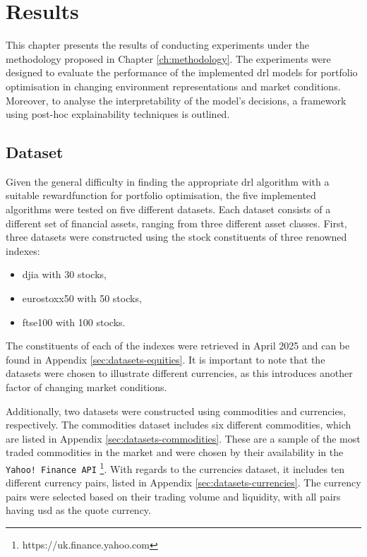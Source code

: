 \chapter{Results} \label{ch:results}

This chapter presents the results of conducting experiments under the methodology proposed in Chapter \ref{ch:methodology}. The experiments were designed to evaluate the performance of the implemented \acrshort{drl} models for portfolio optimisation in changing environment representations and market conditions. Moreover, to analyse the interpretability of the model's decisions, a framework using post-hoc explainability techniques is outlined.

\section{Dataset} \label{sec:dataset}

Given the general difficulty in finding the appropriate \acrshort{drl} algorithm with a suitable \gls{rewardfunction} for portfolio optimisation, the five implemented algorithms were tested on five different datasets. Each dataset consists of a different set of financial assets, ranging from three different asset classes. First, three datasets were constructed using the stock constituents of three renowned indexes:
\begin{itemize}
    \item \acrfull{djia} with 30 stocks,
    \item \acrfull{eurostoxx50} with 50 stocks,
    \item \acrfull{ftse100} with 100 stocks.
\end{itemize}

The constituents of each of the indexes were retrieved in April 2025 and can be found in Appendix \ref{sec:datasets-equities}. It is important to note that the datasets were chosen to illustrate different currencies, as this introduces another factor of changing market conditions. 

Additionally, two datasets were constructed using commodities and currencies, respectively. The commodities dataset includes six different commodities, which are listed in Appendix \ref{sec:datasets-commodities}. These are a sample of the most traded commodities in the market and were chosen by their availability in the \texttt{Yahoo! Finance API} \footnote{https://uk.finance.yahoo.com}. With regards to the currencies dataset, it includes ten different currency pairs, listed in Appendix \ref{sec:datasets-currencies}. The currency pairs were selected based on their trading volume and liquidity, with all pairs having \acrfull{usd} as the quote currency.

